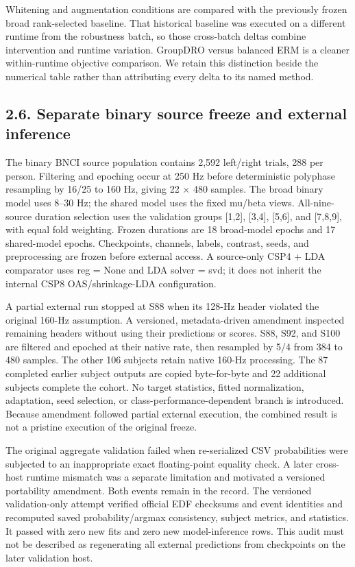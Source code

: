 \documentclass[11pt]{article}
\begin{document}
Whitening and augmentation conditions are compared with the previously frozen broad rank-selected baseline. That historical baseline was executed on a different runtime from the robustness batch, so those cross-batch deltas combine intervention and runtime variation. GroupDRO versus balanced ERM is a cleaner within-runtime objective comparison. We retain this distinction beside the numerical table rather than attributing every delta to its named method.

\subsection*{2.6. Separate binary source freeze and external inference}
The binary BNCI source population contains 2,592 left/right trials, 288 per person. Filtering and epoching occur at 250 Hz before deterministic polyphase resampling by 16/25 to 160 Hz, giving 22 $\times$ 480 samples. The broad binary model uses 8--30 Hz; the shared model uses the fixed mu/beta views. All-nine-source duration selection uses the validation groups [1,2], [3,4], [5,6], and [7,8,9], with equal fold weighting. Frozen durations are 18 broad-model epochs and 17 shared-model epochs. Checkpoints, channels, labels, contrast, seeds, and preprocessing are frozen before external access. A source-only CSP4 + LDA comparator uses reg = None and LDA solver = svd; it does not inherit the internal CSP8 OAS/shrinkage-LDA configuration.

A partial external run stopped at S88 when its 128-Hz header violated the original 160-Hz assumption. A versioned, metadata-driven amendment inspected remaining headers without using their predictions or scores. S88, S92, and S100 are filtered and epoched at their native rate, then resampled by 5/4 from 384 to 480 samples. The other 106 subjects retain native 160-Hz processing. The 87 completed earlier subject outputs are copied byte-for-byte and 22 additional subjects complete the cohort. No target statistics, fitted normalization, adaptation, seed selection, or class-performance-dependent branch is introduced. Because amendment followed partial external execution, the combined result is not a pristine execution of the original freeze.

The original aggregate validation failed when re-serialized CSV probabilities were subjected to an inappropriate exact floating-point equality check. A later cross-host runtime mismatch was a separate limitation and motivated a versioned portability amendment. Both events remain in the record. The versioned validation-only attempt verified official EDF checksums and event identities and recomputed saved probability/argmax consistency, subject metrics, and statistics. It passed with zero new fits and zero new model-inference rows. This audit must not be described as regenerating all external predictions from checkpoints on the later validation host.
\end{document}
